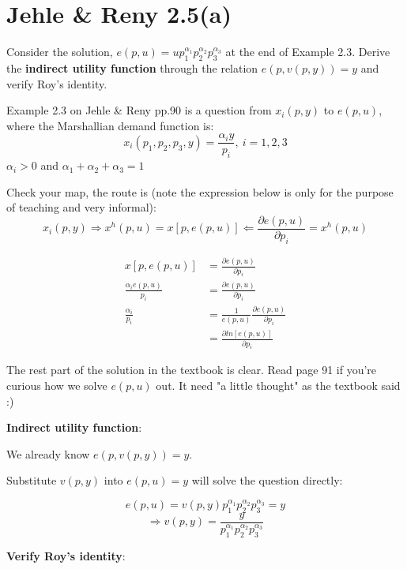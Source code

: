 \documentclass{article}
\begin{document}
\section{Jehle \& Reny 2.5(a)}
Consider the solution, $e(p, u) = up_1^{\alpha_1}p_2^{\alpha_2}p_3^{\alpha_3}$ at the end of Example 2.3.
Derive the \textbf{indirect utility function} through the relation $e(p, v(p, y)) = y$ and verify Roy's identity.

\vspace{3mm}

\begin{mdframed}[backgroundcolor=blue!20,linecolor=white]
Example 2.3 on Jehle \& Reny pp.90 is a question from $x_i(p,y)$ to $e(p,u)$, where the Marshallian demand function is:
$$x_i(p_1,p_2,p_3,y) = \frac{\alpha_i y}{p_i} , \ i=1,2,3$$
 $\alpha_i >0$ and $\alpha_1+\alpha_2+\alpha_3 = 1$

Check your map, the route is (note the expression below is only for the purpose of teaching and very informal):
$$x_i(p,y) \Rightarrow x^h(p,u) = x[p,e(p,u)] \Leftarrow \frac{\partial e(p,u)}{\partial p_i} = x^h(p,u)$$

\begin{align*}
x[p,e(p,u)] &=  \frac{\partial e(p,u)}{\partial p_i} \\
\frac{\alpha_i e(p,u)}{p_i} &=  \frac{\partial e(p,u)}{\partial p_i} \\
\frac{\alpha_i }{p_i} &=  \frac{1}{e(p,u)}\frac{\partial e(p,u)}{\partial p_i} \\
&=  \frac{\partial ln[e(p,u)]}{\partial p_i}
\end{align*}

The rest part of the solution in the textbook is clear. Read page 91 if you're curious how we solve $e(p,u)$ out. It need "a little thought" as the textbook said :)

\end{mdframed}


\textbf{Indirect utility function}:

We already know $e(p, v(p, y)) = y$.

Substitute $v(p, y)$ into $e(p, u) = y$ will solve the question directly:

$$e(p, u) = v(p, y) p_1^{\alpha_1}p_2^{\alpha_2}p_3^{\alpha_3} = y$$
$$\Rightarrow v(p, y) = \frac{y}{p_1^{\alpha_1}p_2^{\alpha_2}p_3^{\alpha_3}}$$

\textbf{Verify Roy's identity}:
\end{document}
